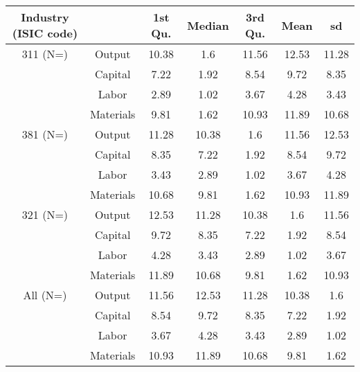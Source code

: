 \begin{table}[H]
\centering
\begin{tabular}{ccccccc}
  \hline\hline Industry (ISIC code) &   & 1st Qu. & Median & 3rd Qu. & Mean & sd \\ 
  \hline
311 (N=) & Output & 10.38 & 1.6 & 11.56 & 12.53 & 11.28 \\ 
   & Capital & 7.22 & 1.92 & 8.54 & 9.72 & 8.35 \\ 
   & Labor & 2.89 & 1.02 & 3.67 & 4.28 & 3.43 \\ 
   & Materials & 9.81 & 1.62 & 10.93 & 11.89 & 10.68 \\ 
  381 (N=) & Output & 11.28 & 10.38 & 1.6 & 11.56 & 12.53 \\ 
   & Capital & 8.35 & 7.22 & 1.92 & 8.54 & 9.72 \\ 
   & Labor & 3.43 & 2.89 & 1.02 & 3.67 & 4.28 \\ 
   & Materials & 10.68 & 9.81 & 1.62 & 10.93 & 11.89 \\ 
  321 (N=) & Output & 12.53 & 11.28 & 10.38 & 1.6 & 11.56 \\ 
   & Capital & 9.72 & 8.35 & 7.22 & 1.92 & 8.54 \\ 
   & Labor & 4.28 & 3.43 & 2.89 & 1.02 & 3.67 \\ 
   & Materials & 11.89 & 10.68 & 9.81 & 1.62 & 10.93 \\ 
  All (N=) & Output & 11.56 & 12.53 & 11.28 & 10.38 & 1.6 \\ 
   & Capital & 8.54 & 9.72 & 8.35 & 7.22 & 1.92 \\ 
   & Labor & 3.67 & 4.28 & 3.43 & 2.89 & 1.02 \\ 
   & Materials & 10.93 & 11.89 & 10.68 & 9.81 & 1.62 \\ 
   \hline
\end{tabular}
\end{table}
